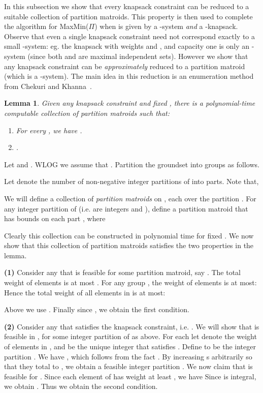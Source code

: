 \documentclass[11pt,letterpaper]{article}
\newtheorem{lemma}[theorem]{Lemma}
\newenvironment{proof}{

\noindent{\bf Proof:}} {\hfill


}
\def\cov{\ensuremath{\Pi}\xspace}
\def\mmp{{\sf MaxMin(\cov)}\xspace}
\newcounter{note}[section]
\begin{document}
In this subsection we show that every knapsack constraint can be reduced to a suitable collection of partition
matroids. This property is then used to complete the algorithm for \mmp when  is given by a -system {\em
and} a -knapsack.
Observe that even a single knapsack constraint need not correspond exactly to a small -system: eg. the knapsack with
weights  and , and capacity one is only an -system (since both  and
 are maximal independent sets).
However we show that any knapsack constraint can be {\em approximately} reduced to a partition matroid (which is a
-system).
The main idea in this reduction is an enumeration method from Chekuri and Khanna~\cite{CK04-multidim}.

\begin{lemma}\label{lem:knap-to-mat}
  Given any knapsack constraint  and
  fixed , there is a polynomial-time computable
  collection  of  partition matroids such that:
  \begin{enumerate}
  \item For every , we have .
  \item .
  \end{enumerate}
\end{lemma}
\begin{proof}
Let  and . WLOG we assume that . Partition the
groundset  into  groups as follows.

Let  denote the number of non-negative integer partitions of  into  parts. Note that,


We will define a collection of  {\em partition matroids} on , each over the partition . For any integer partition  of  (i.e.  are integers and
), define a partition matroid  that has bounds  on each part
, where


Clearly this collection can be constructed in polynomial time for fixed . We now show that this collection of
partition matroids satisfies the two properties in the lemma.

{\bf (1)} Consider any  that is feasible for some partition matroid, say . The total weight of
elements  is at most . For any group , the weight of elements
 is at most:
 Hence the total weight of all elements in  is at most:

Above we use . Finally since , we obtain the first condition.

{\bf (2)} Consider  any  that satisfies the knapsack constraint, i.e. . We will show
that  is feasible in , for some integer partition  of  as above. For each
 let  denote the weight of elements in , and  be the unique integer that satisfies
. Define  to be the integer partition
. We have , which follows from the fact . By increasing s arbitrarily so that they total to , we obtain  a
feasible integer partition .
We now claim that  is feasible for . Since each element of  has weight at least , we have
 Since  is integral, we obtain . Thus we obtain the second condition.
\end{proof}
\end{document}
